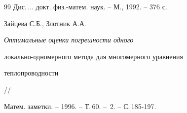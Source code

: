 \begin{thebibliography}{99}
Дис.\,$\dotsc$ докт. физ.-матем. наук. -- М., 1992. -- 376 с.







Зайцева С.Б., Злотник А.А. {\em Оптимальные оценки погрешности одного


локально-одномерного метода для многомерного уравнения 


теплопроводности} //


Матем. заметки. -- 1996. -- Т.\,60. -- \No\,2. -- С.\,185-197.





\end{thebibliography}





\vskip 2cm


















